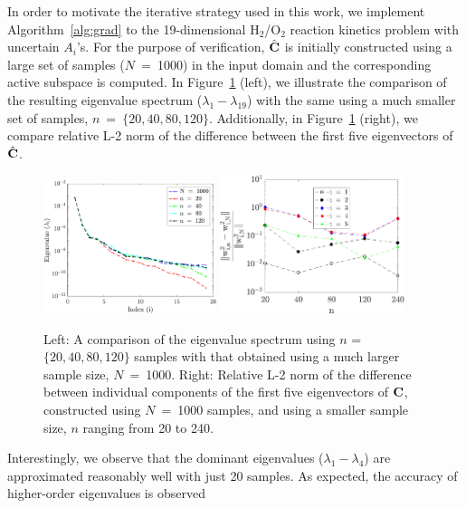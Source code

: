 In order to motivate the iterative strategy used in this work, we implement Algorithm~\ref{alg:grad} to the
19-dimensional H$_2$/O$_2$ reaction kinetics problem with uncertain $A_i$'s. For the purpose of
verification, $\hat{\mathbf{{C}}}$ is initially constructed using a large set of samples ($N$~=~1000) in the input
domain and the corresponding active subspace is computed. In Figure~\ref{fig:eig_comp} (left), we illustrate
the comparison of the resulting eigenvalue spectrum ($\lambda_1 - \lambda_{19}$) with the same using a much 
smaller set of samples, $n$~=~$\{20,40,80,120\}$. Additionally, in Figure~\ref{fig:eig_comp} (right), we compare
relative L-2 norm of the difference between the first five eigenvectors of $\hat{\mathbf{{C}}}$.
%
\begin{figure}[htbp]
 \begin{center}
  \includegraphics[width=0.45\textwidth]{./Figures/eig_comp}
   \includegraphics[width=0.48\textwidth]{./Figures/err_eigv_1_5}
\caption{Left: A comparison of the eigenvalue spectrum using $n$ = $\{20,40,80,120\}$ samples with that
obtained using a much larger sample size, $N$~=~1000. Right: Relative L-2 norm of the difference between
individual components of the first five eigenvectors of $\mathbf{{C}}$, constructed using $N$~=~1000 samples,
and using a smaller sample size, $n$ ranging from 20 to 240.} 
\label{fig:eig_comp}
\end{center}
\end{figure}
%
Interestingly, we observe that the dominant eigenvalues ($\lambda_1 - \lambda_4$) are approximated 
reasonably well with just 20 samples. As expected, the accuracy of higher-order eigenvalues is observed
